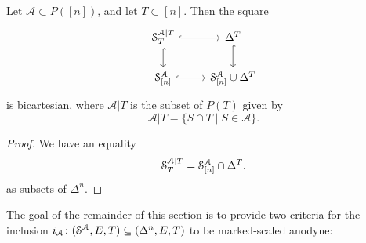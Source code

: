 \documentclass[main.tex]{subfiles}
\begin{document}
\begin{lemma}
  \label{lemma:bicartesian_square}
  Let $\mathcal{A} \subset P([n])$, and let $T \subset [n]$. Then the square
  \begin{equation*}
    \begin{tikzcd}
      \S^{\mathcal{A}|T}_{T}
      \arrow[r, hook]
      \arrow[d, hook]
      & \Delta^{T}
      \arrow[d, hook]
      \\
      \S^{\mathcal{A}}_{[n]}
      \arrow[r, hook]
      & \S^{\mathcal{A}}_{[n]} \cup \Delta^{T}
    \end{tikzcd}
  \end{equation*}
  is bicartesian, where $\mathcal{A}|T$ is the subset of $P(T)$ given by
  \begin{equation*}
    \mathcal{A}|T = \{S \cap T \mid S \in \mathcal{A}\}.
  \end{equation*}
\end{lemma}
\begin{proof}
  We have an equality
  \begin{equation*}
    \mathcal{S}_{T}^{\mathcal{A}|T} = \S^{\mathcal{A}}_{[n]} \cap \Delta^{T}.
  \end{equation*}
  as subsets of $\Delta^{n}$.
\end{proof}


The goal of the remainder of this section is to provide two criteria for the inclusion $i_{\mathcal{A}}\colon (\S^{\mathcal{A}}, E, T) \subseteq (\Delta^{n}, E, T)$ to be marked-scaled anodyne:

%
\end{document}
